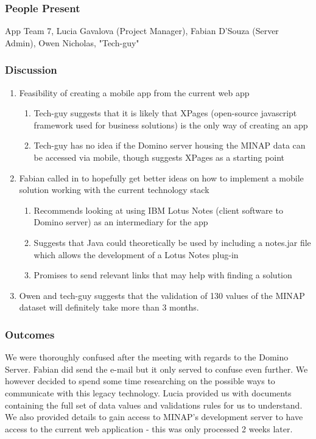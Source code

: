 \documentclass[12pt,a4paper,oneside,titlepage]{article}
\begin{document}
\subsubsection{People Present}
App Team 7, Lucia Gavalova (Project Manager), Fabian D'Souza (Server Admin), Owen Nicholas, "Tech-guy"
\subsubsection{Discussion}
\begin{enumerate}
	\item Feasibility of creating a mobile app from the current web app 
	\begin{enumerate}
	\item Tech-guy suggests that it is likely that XPages (open-source javascript framework used for business solutions) is the only way of creating an app 
	\item Tech-guy has no idea if the Domino server housing the MINAP data can be accessed via mobile, though suggests XPages as a starting point 
	\end{enumerate}
	\item Fabian called in to hopefully get better ideas on how to implement a mobile solution working with the current technology stack 
	\begin{enumerate}
	\item Recommends looking at using IBM Lotus Notes (client software to Domino server) as an intermediary for the app 
	\item Suggests that Java could theoretically be used by including a notes.jar file which allows the development of a Lotus Notes plug-in 
	\item Promises to send relevant links that may help with finding a solution 
	\end{enumerate}
	\item Owen and tech-guy suggests that the validation of 130 values of the MINAP dataset will definitely take more than 3 months.
\end{enumerate}
\subsubsection{Outcomes}
We were thoroughly confused after the meeting with regards to the Domino Server. Fabian did send the e-mail but it only served to confuse even further. We however decided to spend some time researching on the possible ways to communicate with this legacy technology. Lucia provided us with documents containing the full set of data values and validations rules for us to understand. We also provided details to gain access to MINAP’s development server to have access to the current web application - this was only processed 2 weeks later.
\end{document}
